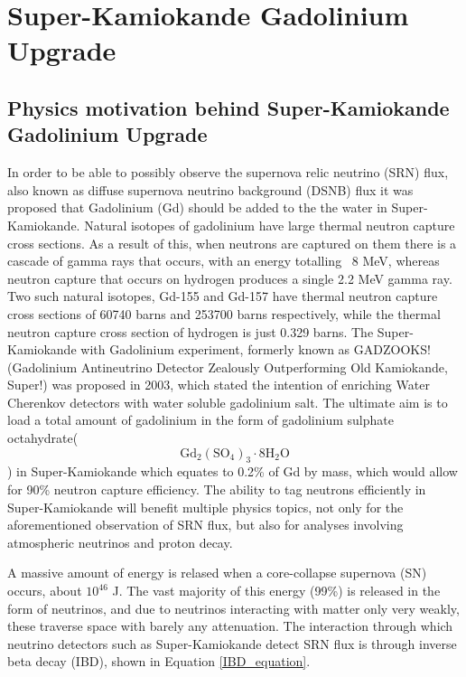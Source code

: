 \chapter{Super-Kamiokande Gadolinium Upgrade}\label{chp:superkgdupgrade}


\section{Physics motivation behind Super-Kamiokande Gadolinium Upgrade}

In order to be able to possibly observe the supernova relic neutrino (SRN) flux, also known as diffuse supernova neutrino background (DSNB) flux it was proposed that Gadolinium (Gd) should be added to the the water in Super-Kamiokande. Natural isotopes of gadolinium have large thermal neutron capture cross sections. As a result of this, when neutrons are captured on them there is a cascade of gamma rays that occurs, with an energy totalling ~8 MeV, whereas neutron capture that occurs on hydrogen produces a single 2.2 MeV gamma ray. Two such natural isotopes, Gd-155 and Gd-157 have thermal neutron capture cross sections of 60740 barns and 253700 barns respectively, while the thermal neutron capture cross section of hydrogen is just 0.329 barns. The Super-Kamiokande with Gadolinium experiment, formerly known as GADZOOKS! (Gadolinium Antineutrino Detector Zealously Outperforming Old Kamiokande, Super!) was proposed in 2003, which stated the intention of enriching Water Cherenkov detectors with water soluble gadolinium salt. The ultimate aim is to load a total amount of gadolinium in the form of gadolinium sulphate octahydrate($$
\mathrm{Gd}_{2}\left(\mathrm{SO}_{4}\right)_{3} \cdot 8 \mathrm{H}_{2} \mathrm{O}$$) in Super-Kamiokande which equates to 0.2\% of Gd by mass, which would allow for 90\% neutron capture efficiency. The ability to tag neutrons efficiently in Super-Kamiokande will benefit multiple physics topics, not only for the aforementioned observation of SRN flux, but also for analyses involving atmospheric neutrinos and proton decay. 
\newline

A massive amount of energy is relased when a core-collapse supernova (SN) occurs, about $10^{46}$ J. The vast majority of this energy (99\%) is released in the form of neutrinos, and due to neutrinos interacting with matter only very weakly, these traverse space with barely any attenuation. The interaction through which neutrino detectors such as Super-Kamiokande detect SRN flux is through inverse beta decay (IBD), shown in Equation \ref{IBD_equation}. 

